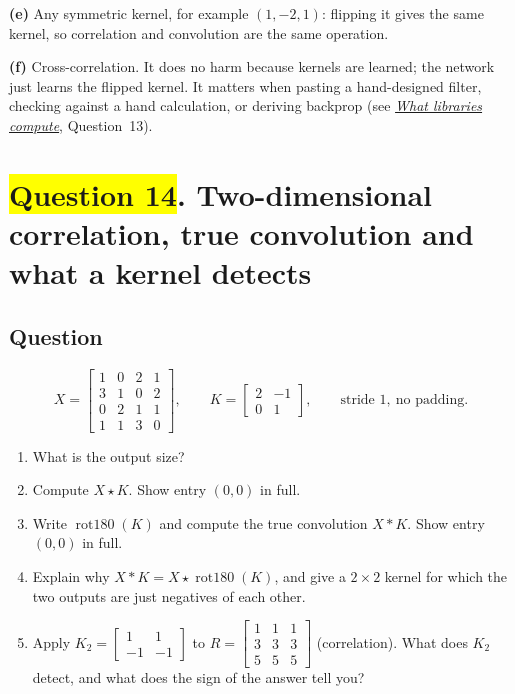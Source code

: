 \documentclass[12pt,a4paper]{article}
\newcommand{\seeconcept}[3]{(see \hyperref[#1]{\textit{#2}}, Question~#3)}
\newcommand{\rot}{\operatorname{rot180}}
\newcommand{\hlq}[1]{{\setlength{\fboxsep}{1.5pt}\colorbox{yellow}{#1}}}
\begin{document}
\textbf{(e)} Any symmetric kernel, for example $(1,-2,1)$: flipping it gives the same kernel, so correlation and convolution are the same operation.

\textbf{(f)} Cross-correlation. It does no harm because kernels are learned; the network just learns the flipped kernel. It matters when pasting a hand-designed filter, checking against a hand calculation, or deriving backprop \seeconcept{c:libcorr}{What libraries compute}{13}.

\section[Question 14. Two-dimensional correlation, true convolution and what a kernel detects]{\hlq{Question 14}. Two-dimensional correlation, true convolution and what a kernel detects}
\subsection*{Question}
\[
X=\begin{bmatrix}1&0&2&1\\3&1&0&2\\0&2&1&1\\1&1&3&0\end{bmatrix},\qquad K=\begin{bmatrix}2&-1\\0&1\end{bmatrix},\qquad\text{stride }1,\ \text{no padding}.
\]
\begin{enumerate}[label=(\alph*)]
\item[(a)] What is the output size?
\item[\hlq{(b)}] Compute $X\star K$. Show entry $(0,0)$ in full.
\item[\hlq{(c)}] Write $\rot(K)$ and compute the true convolution $X*K$. Show entry $(0,0)$ in full.
\item[\hlq{(d)}] Explain why $X*K=X\star\rot(K)$, and give a $2\times2$ kernel for which the two outputs are just negatives of each other.
\item[(e)] Apply $K_2=\begin{bmatrix}1&1\\-1&-1\end{bmatrix}$ to $R=\begin{bmatrix}1&1&1\\3&3&3\\5&5&5\end{bmatrix}$ (correlation). What does $K_2$ detect, and what does the sign of the answer tell you?
\end{enumerate}
\end{document}
